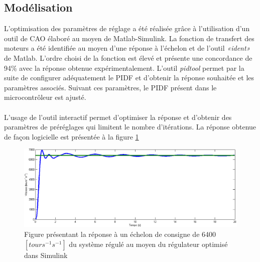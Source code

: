 \subsection{Modélisation}
L'optimisation des paramètres de réglage a été réalisée grâce à l'utilisation d'un outil de CAO élaboré au moyen de Matlab-Simulink. La fonction de transfert des moteurs a été identifiée au moyen d'une réponse à l'échelon et de l'outil \textit{«ident»} de Matlab. L'ordre choisi de la fonction est élevé et présente une concordance de 94\% avec la réponse obtenue expérimentalement. L'outil \textit{pidtool} permet par la suite de configurer adéquatement le PIDF et d'obtenir la réponse souhaitée et les paramètres associés. Suivant ces paramètres, le PIDF présent dans le microcontrôleur est ajusté.
\paragraph{}L'usage de l'outil interactif permet d'optimiser la réponse et d'obtenir des paramètres de préréglages qui limitent le nombre d'itérations. La réponse obtenue de façon logicielle est présentée à la figure \ref{fig:as_1}
\begin{figure}[htbp]
\centering
\includegraphics[scale=0.6]{fig/asservissement_1.png}
\caption{Figure présentant la réponse à un échelon de consigne de 6400$\left[tours^{-1}s^{-1}\right]$ du système régulé au moyen du régulateur optimisé dans Simulink}
\label{fig:as_1}
\end{figure}
